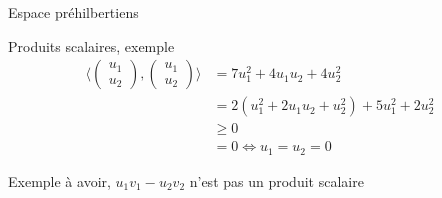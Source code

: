 \begin{parag}{Espace préhilbertiens}
\begin{subparag}{Produits scalaires, exemple}
\begin{align*}
                \langle\begin{pmatrix}
                    u_1 \\ u_2
                \end{pmatrix}, \begin{pmatrix}
                    u_1 \\ u_2 
                \end{pmatrix}\rangle &= 7u_1^2 + 4u_1u_2 + 4u_2^2\\
                &= 2(u_1^2 + 2u_1u_2 + u_2^2) + 5 u_1^2 + 2u_2^2\\
                &\geq 0\\
                &= 0 \Leftrightarrow u_1 = u_2 = 0
                \end{align*}
                \begin{framedremark}
                    Exemple à avoir, 
                    $u_1v_1 - u_2v_2$ n'est pas un produit scalaire
                \end{framedremark}      
            \end{subparag}
        \end{parag}
